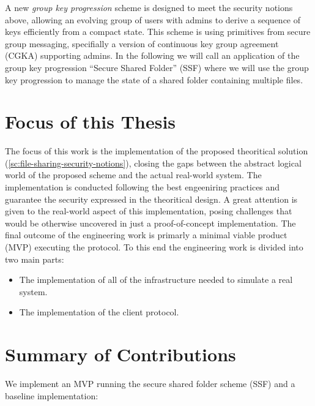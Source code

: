 A new \textit{group key progression} scheme is designed to meet the security notions above,
allowing an evolving group of users with admins to derive a sequence of keys efficiently from a compact state. 
This scheme is using primitives from secure group messaging, 
specifially a version of continuous key group agreement (CGKA) supporting admins.\cite{USENIX:BalColVau23}
In the following we will call an application of the group key progression ``Secure Shared Folder'' (SSF)
where we will use the group key progression to manage the state of a shared folder containing multiple files. 

\section{Focus of this Thesis}\label{sc:focus-of-this-thesis}

The focus of this work is the implementation of the proposed theoritical solution (\cref{sc:file-sharing-security-notions}),
closing the gaps between the abstract logical world of the proposed scheme
and the actual real-world system.
The implementation is conducted following the best engeeniring practices 
and guarantee the security expressed in the theoritical design.
A great attention is given to the real-world aspect of this implementation,
posing challenges that would be otherwise uncovered in just a proof-of-concept implementation.
The final outcome of the engineering work is primarly a minimal viable product (MVP) executing the protocol.
To this end the engineering work is divided into two main parts:
\begin{itemize}
    \item The implementation of all of the infrastructure needed to simulate a real system.
    \item The implementation of the client protocol.
\end{itemize}

\section{Summary of Contributions}\label{sc:summary-of-contributions}

We implement an MVP running the secure shared folder scheme (SSF) and a baseline implementation:

